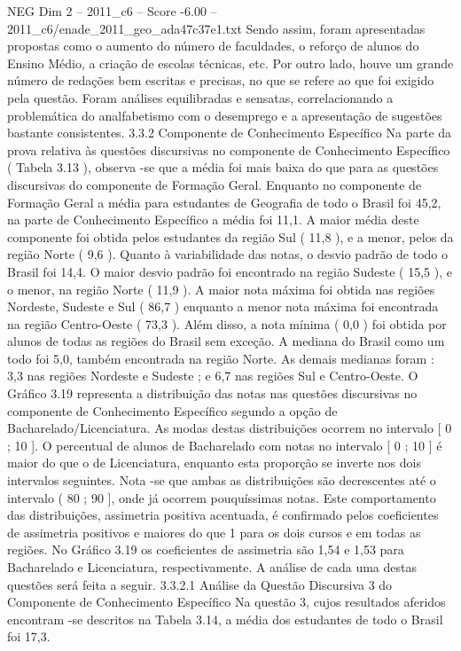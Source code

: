 \begin{textsample}{NEG Dim 2 – 2011\_c6 – Score -6.00 – 2011\_c6/enade\_2011\_geo\_ada47c37e1.txt}
Sendo assim, foram apresentadas propostas como o aumento do número de faculdades, o reforço de alunos do Ensino Médio, a criação de escolas técnicas, etc.
Por outro lado, houve um grande número de redações bem escritas e precisas, no que se refere ao que foi exigido pela questão.
Foram análises equilibradas e sensatas, correlacionando a problemática do analfabetismo com o desemprego e a apresentação de sugestões bastante consistentes. 3.3.2 Componente de Conhecimento Específico Na parte da prova relativa às questões discursivas no componente de Conhecimento Específico ( Tabela 3.13 ), observa -se que a média foi mais baixa do que para as questões discursivas do componente de Formação Geral.
Enquanto no componente de Formação Geral a média para estudantes de Geografia de todo o Brasil foi 45,2, na parte de Conhecimento Específico a média foi 11,1.
A maior média deste componente foi obtida pelos estudantes da região Sul ( 11,8 ), e a menor, pelos da região Norte ( 9,6 ).
Quanto à variabilidade das notas, o desvio padrão de todo o Brasil foi 14,4.
O maior desvio padrão foi encontrado na região Sudeste ( 15,5 ), e o menor, na região Norte ( 11,9 ).
A maior nota máxima foi obtida nas regiões Nordeste, Sudeste e Sul ( 86,7 ) enquanto a menor nota máxima foi encontrada na região Centro-Oeste ( 73,3 ).
Além disso, a nota mínima ( 0,0 ) foi obtida por alunos de todas as regiões do Brasil sem exceção.
A mediana do Brasil como um todo foi 5,0, também encontrada na região Norte.
As demais medianas foram : 3,3 nas regiões Nordeste e Sudeste ; e 6,7 nas regiões Sul e Centro-Oeste.
O Gráfico 3.19 representa a distribuição das notas nas questões discursivas no componente de Conhecimento Específico segundo a opção de Bacharelado/Licenciatura.
As modas destas distribuições ocorrem no intervalo [ 0 ; 10 ].
O percentual de alunos de Bacharelado com notas no intervalo [ 0 ; 10 ] é maior do que o de Licenciatura, enquanto esta proporção se inverte nos dois intervalos seguintes.
Nota -se que ambas as distribuições são decrescentes até o intervalo ( 80 ; 90 ], onde já ocorrem pouquíssimas notas.
Este comportamento das distribuições, assimetria positiva acentuada, é confirmado pelos coeficientes de assimetria positivos e maiores do que 1 para os dois cursos e em todas as regiões.
No Gráfico 3.19 os coeficientes de assimetria são 1,54 e 1,53 para Bacharelado e Licenciatura, respectivamente.
A análise de cada uma destas questões será feita a seguir. 3.3.2.1 Análise da Questão Discursiva 3 do Componente de Conhecimento Específico Na questão 3, cujos resultados aferidos encontram -se descritos na Tabela 3.14, a média dos estudantes de todo o Brasil foi 17,3.

\end{textsample}
